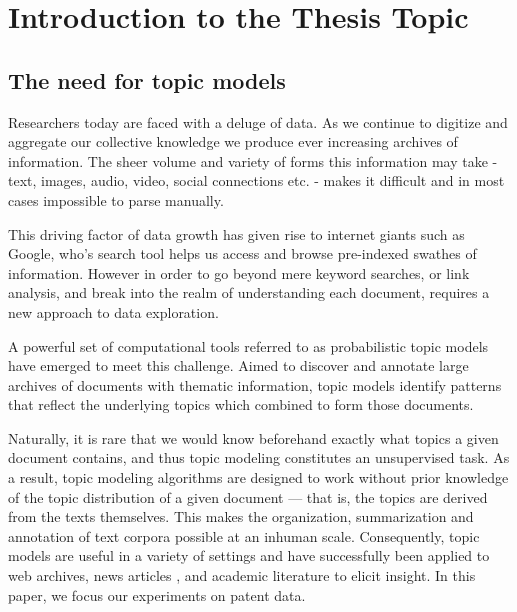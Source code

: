 
\chapter{Introduction to the Thesis Topic} %

\label{Chapter1} %


\newcommand{\keyword}[1]{\textbf{#1}}
\newcommand{\tabhead}[1]{\textbf{#1}}
\newcommand{\code}[1]{\texttt{#1}}
\newcommand{\file}[1]{\texttt{\bfseries#1}}
\newcommand{\option}[1]{\texttt{\itshape#1}}

\section{The need for topic models}
Researchers today are faced with a deluge of data. As we continue to digitize and aggregate our collective knowledge we produce ever increasing archives of information. The sheer volume and variety of forms this information may take - text, images, audio, video, social connections etc. - makes it difficult and in most cases impossible to parse manually. 

This driving factor of data growth has given rise to internet giants such as Google, who's search tool helps us access and browse pre-indexed swathes of information. However in order to go beyond mere keyword searches, or link analysis, and break into the realm of understanding each document, requires a new approach to data exploration.

A powerful set of computational tools referred to as probabilistic topic models have emerged to meet this challenge. Aimed to discover and annotate large archives of documents with thematic information, topic models identify patterns that reflect the underlying topics which combined to form those documents.

Naturally, it is rare that we would know beforehand exactly what topics a given document contains, and thus topic modeling constitutes an unsupervised task. As a result, topic modeling algorithms are designed to work without prior knowledge of the topic distribution of a given document — that is, the topics are derived from the texts themselves. This makes the organization, summarization and annotation of text corpora possible at an inhuman scale. Consequently, topic models are useful in a variety of settings and have successfully been applied to web archives, news articles \parencite{Newman:2006:AET:2106961.2106971}, and academic literature \parencite{Steyvers:2004:PAM:1014052.1014087} to elicit insight. In this paper, we focus our experiments on patent data.


